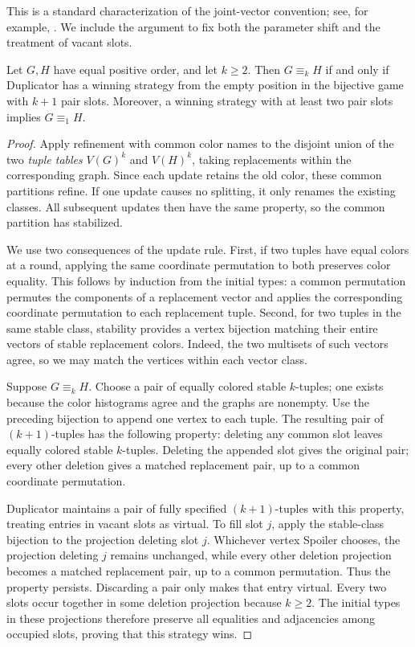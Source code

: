 This is a standard characterization of the joint-vector convention;
see, for example, \cite{KN2019}. We include the argument to fix both
the parameter shift and the treatment of vacant slots.

\begin{lemma}
\label{lem:wl-game}
Let $G,H$ have equal positive order, and let $k\ge 2$. Then
$G\equiv_k H$ if and only if Duplicator has a winning strategy from
the empty position in the bijective game with $k+1$ pair slots.
Moreover, a winning strategy with at least two pair slots implies
$G\equiv_1 H$.
\end{lemma}

\begin{proof}
Apply refinement with common color names to the disjoint union of the
two \emph{tuple tables} $V(G)^k$ and $V(H)^k$, taking replacements
within the corresponding graph. Since each update retains the old
color, these common partitions refine. If one update causes no
splitting, it only renames the existing classes. All subsequent
updates then have the same property, so the common partition has
stabilized.

We use two consequences of the update rule. First, if two tuples have
equal colors at a round, applying the same coordinate permutation to
both preserves color equality. This follows by induction from the
initial types: a common permutation permutes the components of a
replacement vector and applies the corresponding coordinate
permutation to each replacement tuple. Second, for two tuples in the
same stable class, stability provides a vertex bijection matching
their entire vectors of stable replacement colors. Indeed, the two
multisets of such vectors agree, so we may match the vertices within
each vector class.

Suppose $G\equiv_k H$. Choose a pair of equally colored stable
$k$-tuples; one exists because the color histograms agree and the
graphs are nonempty. Use the preceding bijection to append one
vertex to each tuple. The resulting pair of $(k+1)$-tuples has the
following property: deleting any common slot leaves equally colored
stable $k$-tuples. Deleting the appended slot gives the original
pair; every other deletion gives a matched replacement pair, up to
a common coordinate permutation.

Duplicator maintains a pair of fully specified $(k+1)$-tuples with
this property, treating entries in vacant slots as virtual. To fill
slot $j$, apply the stable-class bijection to the projection deleting
slot $j$. Whichever vertex Spoiler chooses, the projection deleting
$j$ remains unchanged, while every other deletion projection becomes
a matched replacement pair, up to a common permutation. Thus the
property persists. Discarding a pair only makes that entry virtual.
Every two slots occur together in some deletion projection because
$k\ge 2$. The initial types in these projections therefore preserve
all equalities and adjacencies among occupied slots, proving that
this strategy wins.


\end{proof}
